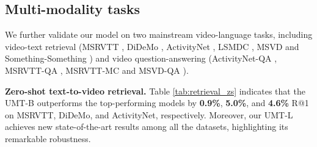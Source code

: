 \documentclass[10pt,twocolumn,letterpaper]{article}
\def\Modelnamelight{UMT}
\begin{document}
\subsection{Multi-modality tasks}
We further validate our model on two mainstream video-language tasks,
including video-text retrieval (MSRVTT \cite{msrvtt},
DiDeMo \cite{didemo}, ActivityNet \cite{anet}, LSMDC \cite{lsmdc}, MSVD \cite{msvd} and Something-Something \cite{lei2022revealing}) 
and video question-answering (ActivityNet-QA \cite{anet_qa}, MSRVTT-QA \cite{msrvtt_qa}, MSRVTT-MC \cite{msrvtt_mc} and MSVD-QA \cite{msrvtt_qa}).


\textbf{Zero-shot text-to-video retrieval.}
Table \ref{tab:retrieval_zs} indicates that the \Modelnamelight-B outperforms the top-performing models \cite{wang2022omnivl,lei2022revealing,Cheng2022VindLUAR} by \textbf{0.9\%}, \textbf{5.0\%}, and \textbf{4.6\%} R@1 on MSRVTT, DiDeMo, and ActivityNet, respectively.
Moreover,
our \Modelnamelight-L achieves new state-of-the-art results among all the datasets, 
highlighting its remarkable robustness.
\end{document}
